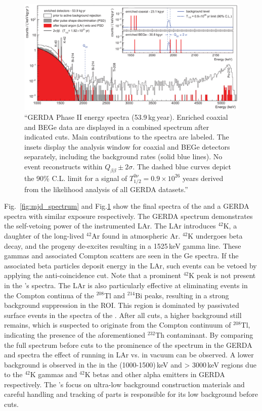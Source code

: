 \begin{figure}[tbh]
    \centering
    \includegraphics[width=6in]{figs/0vbb/geda_spectrum_breakdown.pdf}
    \caption{``GERDA Phase II energy spectra (53.9\,kg\,year). Enriched coaxial and BEGe data are displayed in a combined spectrum after indicated cuts. Main contributions to the spectra are labeled. The insets display the analysis window for coaxial and BEGe detectors separately, including the background rates (solid blue lines). No event reconstructs within $Q_{\beta\beta} \pm 2\sigma$. The dashed blue curves depict the 90\% C.L. limit for a \novbb{} signal of $T^{0\nu}_{1/2} = 0.9\times10^{26}$ years derived from the likelihood analysis of all GERDA datasets.''~\cite{gerda}}
    \label{fig:gerda_spectrum}
\end{figure}  

Fig.~\ref{fig:mjd_spectrum} and Fig.\ref{fig:gerda_spectrum} show the final spectra of the {\DEMit} and a GERDA spectra with similar exposure respectively. The GERDA spectrum demonstrates the self-vetoing power of the instrumented LAr. The LAr introduces $^{42}$K, a daughter of the long-lived $^{42}$Ar found in atmospheric Ar. $^{42}$K undergoes beta decay, and the progeny de-excites resulting in a 1525\,keV gamma line. These gammas and associated Compton scatters are seen in the Ge spectra. If the associated beta particles deposit energy in the LAr, such events can be vetoed by applying the anti-coincidence cut. Note that a prominent $^{42}$K peak is not present in the {\DEMit}'s spectra. The LAr is also particularly effective at eliminating events in the Compton continua of the $^{208}$Tl and $^{214}$Bi peaks, resulting in a strong background suppression in the \novbb{} ROI. This region is dominated by passivated surface events in the spectra of the {\DEMit}. After all cuts, a higher background still remains, which is suspected to originate from the Compton continuum of $^{208}$Tl, indicating the presence of the aforementioned $^{232}$Th contaminant. By comparing the full spectrum before cuts to the prominence of the \twovbb{} spectrum in the GERDA and {\MJDEMit} spectra the effect of running in LAr vs. in vacuum can be observed. A lower background is observed in the {\DEMit} in the (1000-1500)\,keV and > 3000\,keV regions due to the $^{42}$K gammas and $^{42}$K betas and other alpha emitters in GERDA respectively. The {\MJDEMit}'s focus on ultra-low background construction materials and careful handling and tracking of parts is responsible for its low background before cuts. 


